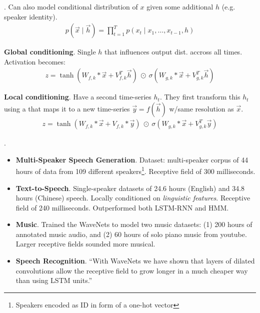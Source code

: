 \documentclass[11pt]{article}
\begin{document}
. Can also model conditional distribution of $x$ given some additional $h$ (e.g. speaker identity).
\begin{align}
p(\vec x \mid \vec h) = \prod_{t = 1}^{T} p(x_t \mid x_1, \ldots, x_{t - 1}, h)
\end{align}
\begin{compactitem}[$\rightarrow$]
	\item \textbf{Global conditioning}. Single $h$ that influences output dist. accross all times. Activation becomes:
	\begin{align}
	z = \tanh\left( W_{f,k} * \vec x +  V_{f,k}^T \vec h\right) 
	~ \odot ~ 
	\sigma\left( W_{g,k} * \vec x + V_{g,k}^T \vec h\right)
	\end{align}
	
	\item \textbf{Local conditioning}. Have a second time-series $h_t$. They first transform this $h_t$ using a  that maps it to a new time-series $\vec y = f(\vec h)$ w/same resolution as $\vec x$. 
	\begin{align}
	z = \tanh\left( W_{f,k} * \vec x +  V_{f,k} * \vec y \right) 
	~ \odot ~ 
	\sigma\left( W_{g,k} * \vec x + V_{g,k}^T \vec y\right)
	\end{align}
	
	
\end{compactitem}




\myspace
\p {}. 
\begin{itemize}
	\item \textbf{Multi-Speaker Speech Generation}. Dataset: multi-speaker corpus of 44 hours of data from 109 different speakers\footnote{Speakers encoded as ID in form of a one-hot vector}. Receptive field of 300 milliseconds.
	
	
	\item \textbf{Text-to-Speech}. Single-speaker datasets of 24.6 hours (English) and 34.8 hours (Chinese) speech. Locally conditioned on \textit{linguistic features}. Receptive field of 240 milliseconds. Outperformed both LSTM-RNN and HMM.
	
	
	\item \textbf{Music}. Trained the WaveNets to model two music datasets: (1) 200 hours of annotated music audio, and (2) 60 hours of solo piano music from youtube. Larger receptive fields sounded more musical.
	
	\item \textbf{Speech Recognition}. ``With WaveNets we have shown that layers of dilated convolutions allow the receptive field to grow longer in a much cheaper way than using LSTM units.''
\end{itemize}
\end{document}
